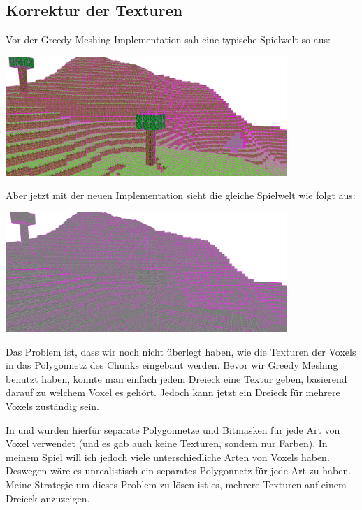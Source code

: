 \pagebreak

\subsection{Korrektur der Texturen}

Vor der Greedy Meshing Implementation sah eine
typische Spielwelt so aus:

\begin{center}
\includegraphics[width=0.8\textwidth]{../assets/greedy/landscape_normal.png}
\end{center}

Aber jetzt mit der neuen Implementation
sieht die gleiche Spielwelt wie folgt aus:

\begin{center}
\includegraphics[width=0.8\textwidth]{../assets/greedy/landscape_stone_only.png}
\end{center}

Das Problem ist, dass wir noch nicht überlegt haben,
wie die Texturen der Voxels in das Polygonnetz des
Chunks eingebaut werden.
Bevor wir Greedy Meshing benutzt haben, konnte man
einfach jedem Dreieck eine Textur geben, basierend
darauf zu welchem Voxel es gehört.
Jedoch kann jetzt ein Dreieck für mehrere Voxels
zuständig sein.

In \cite{yt_bin_greedy_mesher} und
\cite{gh_bin_greedy_mesher} wurden hierfür separate
Polygonnetze und Bitmasken für jede Art von Voxel
verwendet (und es gab auch keine Texturen, sondern
nur Farben).
In meinem Spiel will ich jedoch viele unterschiedliche
Arten von Voxels haben. Deswegen wäre es unrealistisch
ein separates Polygonnetz für jede Art zu haben.
Meine Strategie um dieses Problem zu lösen ist es,
mehrere Texturen auf einem Dreieck anzuzeigen.

